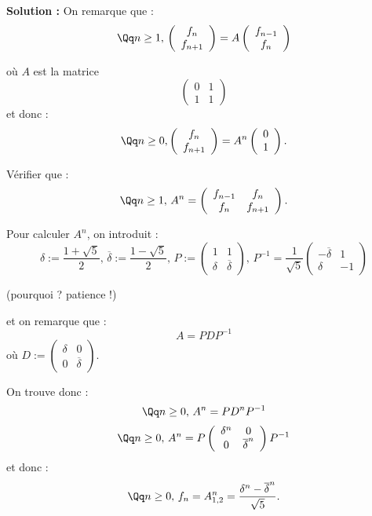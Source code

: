 \documentclass[class=report,crop=false]{standalone}
\begin{document}
{\bf Solution : } On remarque que :
\[\Qq n \ge 1,\, \left(\begin{array}{c}
f_{n}\\
f_{n+1}
\end{array}\right) = A  \left(\begin{array}{c}
f_{n-1}\\
f_{n}
\end{array}\right)\]

où $A$ est la matrice 
\[\left(\begin{array}{cc}
0 & 1 \\
1 & 1
\end{array}\right)\]
et donc : \[\Qq n \ge 0,  \left(\begin{array}{c}
f_{n}\\
f_{n+1}
\end{array}\right) = A^{n} \left(\begin{array}{c}
0\\
1
\end{array}\right) .\]

Vérifier que : \[\Qq n \ge 1, \, A^n = \left(\begin{array}{cc}
f_{n-1}&f_n\\
f_n & f_{n+1}
\end{array}\right) .\]


Pour calculer $A^n$, on introduit :
\[\delta := \frac{1+ \sqrt{5}}{2},\, \overline{\delta}:= \frac{1-\sqrt{5}}{2},\, P:=\left(\begin{array}{cc}
1 & 1\\
\delta & \overline{\delta}
\end{array}\right),\, P^{-1}= \frac{1}{\sqrt{5}}\left(\begin{array}{cc}
- \overline{\delta} & 1\\
\delta & -1
\end{array}\right) \]

(\og pourquoi ? patience !\fg )

et on remarque que :
\[A = PD P^{-1}\]
où $D:= \left(\begin{array}{cc}
\delta & 0\\
0& \overline{\delta}
\end{array}\right)$.

On trouve donc : \[\Qq n\ge 0,\, A^n = PD^nP^{-1}\]
\[\Qq n\ge 0,\, A^n =P\left(\begin{array}{cc}
\delta^n & 0\\
0& \overline{\delta}^n
\end{array}\right)P^{-1}\]
et donc :
\[ \Qq n \ge 0 ,\, f_n = A^{n}_{1,2} = \frac{\delta^n - \overline{\delta}^n}{\sqrt{5}}.\]
\end{document}
